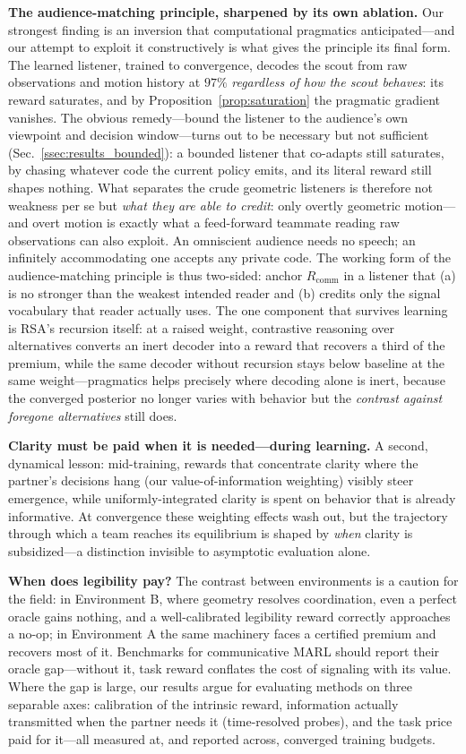 \documentclass{article}
\newcommand{\Rcomm}{R_{\text{comm}}}
\begin{document}
\textbf{The audience-matching principle, sharpened by its own ablation.} Our strongest finding is an inversion that computational pragmatics anticipated---and our attempt to exploit it constructively is what gives the principle its final form. The learned listener, trained to convergence, decodes the scout from raw observations and motion history at $97\%$ \emph{regardless of how the scout behaves}: its reward saturates, and by Proposition~\ref{prop:saturation} the pragmatic gradient vanishes. The obvious remedy---bound the listener to the audience's own viewpoint and decision window---turns out to be necessary but not sufficient (Sec.~\ref{ssec:results_bounded}): a bounded listener that co-adapts still saturates, by chasing whatever code the current policy emits, and its literal reward still shapes nothing. What separates the crude geometric listeners is therefore not weakness per se but \emph{what they are able to credit}: only overtly geometric motion---and overt motion is exactly what a feed-forward teammate reading raw observations can also exploit. An omniscient audience needs no speech; an infinitely accommodating one accepts any private code. The working form of the audience-matching principle is thus two-sided: anchor $\Rcomm$ in a listener that (a) is no stronger than the weakest intended reader and (b) credits only the signal vocabulary that reader actually uses. The one component that survives learning is RSA's recursion itself: at a raised weight, contrastive reasoning over alternatives converts an inert decoder into a reward that recovers a third of the premium, while the same decoder without recursion stays below baseline at the same weight---pragmatics helps precisely where decoding alone is inert, because the converged posterior no longer varies with behavior but the \emph{contrast against foregone alternatives} still does.

\textbf{Clarity must be paid when it is needed---during learning.} A second, dynamical lesson: mid-training, rewards that concentrate clarity where the partner's decisions hang (our value-of-information weighting) visibly steer emergence, while uniformly-integrated clarity is spent on behavior that is already informative. At convergence these weighting effects wash out, but the trajectory through which a team reaches its equilibrium is shaped by \emph{when} clarity is subsidized---a distinction invisible to asymptotic evaluation alone.

\textbf{When does legibility pay?} The contrast between environments is a caution for the field: in Environment B, where geometry resolves coordination, even a perfect oracle gains nothing, and a well-calibrated legibility reward correctly approaches a no-op; in Environment A the same machinery faces a certified premium and recovers most of it. Benchmarks for communicative MARL should report their oracle gap---without it, task reward conflates the cost of signaling with its value. Where the gap is large, our results argue for evaluating methods on three separable axes: calibration of the intrinsic reward, information actually transmitted when the partner needs it (time-resolved probes), and the task price paid for it---all measured at, and reported across, converged training budgets.
\end{document}
